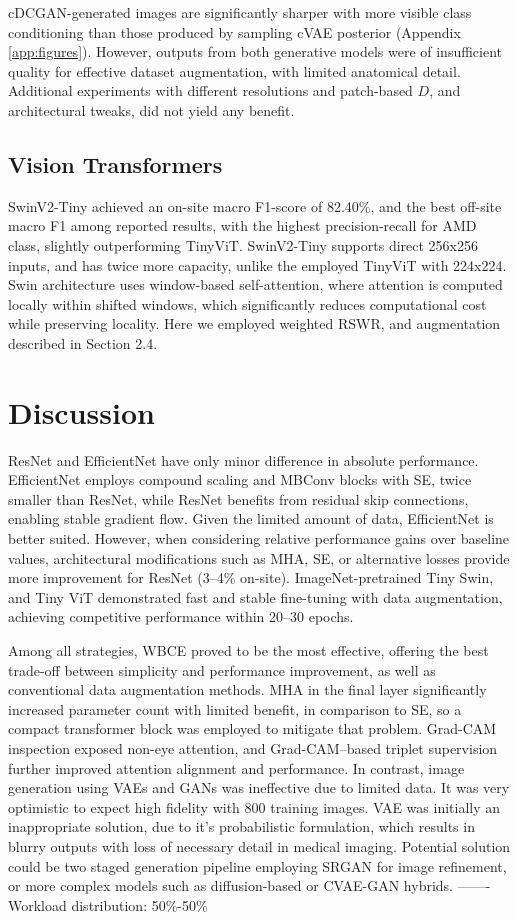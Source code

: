 \documentclass{article}
\begin{document}
cDCGAN-generated images are significantly sharper with more visible class conditioning than those produced by sampling cVAE posterior (Appendix \ref{app:figures}). However, outputs from both generative models were of insufficient quality for effective dataset augmentation, with limited anatomical detail. Additional experiments with different resolutions and patch-based $D$, and architectural tweaks, did not yield any benefit.

\subsection{Vision Transformers}
SwinV2-Tiny achieved an on-site macro F1-score of 82.40\%, and the best off-site macro F1 among reported results, with the highest precision-recall for AMD class, slightly outperforming TinyViT. SwinV2-Tiny supports direct 256x256 inputs, and has twice more capacity, unlike the employed TinyViT with 224x224. Swin architecture uses window-based self-attention, where attention is computed locally within shifted windows, which significantly reduces computational cost while preserving locality. Here we employed weighted RSWR, and augmentation described in Section 2.4.

\section{Discussion}

ResNet and EfficientNet have only minor difference in absolute performance. EfficientNet employs compound scaling and MBConv blocks with SE, twice smaller than ResNet, while ResNet benefits from residual skip connections, enabling stable gradient flow. Given the limited amount of data, EfficientNet is better suited. However, when considering relative performance gains over baseline values, architectural modifications such as MHA, SE, or alternative losses provide more improvement for ResNet (3–4\% on-site). ImageNet-pretrained Tiny Swin, and Tiny ViT demonstrated fast and stable fine-tuning with data augmentation, achieving competitive performance within 20–30 epochs.

Among all strategies, WBCE proved to be the most effective, offering the best trade-off between simplicity and performance improvement, as well as conventional data augmentation methods. MHA in the final layer significantly increased parameter count with limited benefit, in comparison to SE, so a compact transformer block was employed to mitigate that problem. Grad-CAM inspection exposed non-eye attention, and Grad-CAM–based triplet supervision further improved attention alignment and performance. In contrast, image generation using VAEs and GANs was ineffective due to limited data. It was very optimistic to expect high fidelity with 800 training images. VAE was initially an inappropriate solution, due to it's probabilistic formulation, which results in blurry outputs with loss of necessary detail in medical imaging. Potential solution could be two staged generation pipeline employing SRGAN for image refinement, or more complex models such as diffusion-based or CVAE-GAN hybrids. -------Workload distribution: 50\%-50\%
\end{document}
